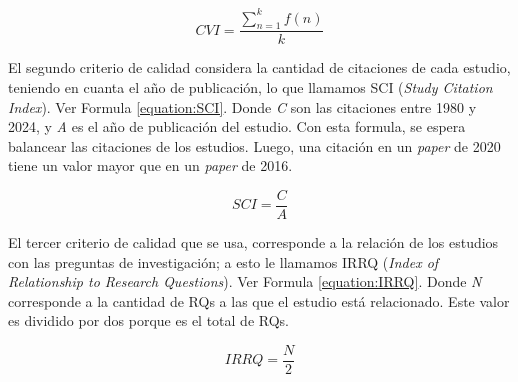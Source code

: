 \begin{equation}
    \label{equation:CVI}
    CVI = \frac{\sum_{n=1}^{k}f(n)}{k}
\end{equation}

El segundo criterio de calidad considera la cantidad de citaciones de cada estudio, teniendo en cuanta el año de publicación, lo que llamamos SCI (\textit{Study Citation Index}). Ver Formula \ref{equation:SCI}. Donde \textit{C} son las citaciones entre 1980 y 2024, y \textit{A} es el año de publicación del estudio. Con esta formula, se espera balancear las citaciones de los estudios. Luego, una citación en un \textit{paper} de 2020 tiene un valor mayor que en un \textit{paper} de 2016.

\begin{equation}
    \label{equation:SCI}
    SCI = \frac{C}{A}
\end{equation}

El tercer criterio de calidad que se usa, corresponde a la relación de los estudios con las preguntas de investigación; a esto le llamamos IRRQ (\textit{Index of Relationship to Research Questions}). Ver Formula \ref{equation:IRRQ}. Donde \textit{N} corresponde a la cantidad de RQs a las que el estudio está relacionado. Este valor es dividido por dos porque es el total de RQs.

\begin{equation}
    \label{equation:IRRQ}
    IRRQ = \frac{N}{2}
\end{equation}
